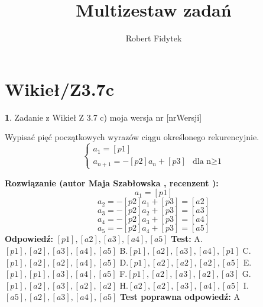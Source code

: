 \documentclass[12pt, a4paper]{article}
\title{Multizestaw zadań}
\author{Robert Fidytek}
\date{}
\theoremstyle{definition} %
\newtheorem{zad}{}
\newcommand{\kategoria}[1]{\section{#1}} %
\newcommand{\zadStart}[1]{\begin{zad}#1\newline} %
\newcommand{\zadStop}{\end{zad}}   %
\newcommand{\rozwStart}[2]{\noindent \textbf{Rozwiązanie (autor #1 , recenzent #2): }\newline} %
\newcommand{\rozwStop}{\newline}                                            %
\newcommand{\odpStart}{\noindent \textbf{Odpowiedź:}\newline}    %
\newcommand{\odpStop}{\newline}                                             %
\newcommand{\testStart}{\noindent \textbf{Test:}\newline} %
\newcommand{\testStop}{\newline} %
\newcommand{\kluczStart}{\noindent \textbf{Test poprawna odpowiedź:}\newline} %
\newcommand{\kluczStop}{\newline} %
\begin{document}
\maketitle


\kategoria{Wikieł/Z3.7c}
\zadStart{Zadanie z Wikieł Z 3.7 c)  moja wersja nr [nrWersji]}

Wypisać pięć początkowych wyrazów ciągu określonego rekurencyjnie.
$$\left\{ \begin{array}{ll}
a_{1}=[p1]\\
a_{n+1}=-[p2]a_{n}+[p3]& \textrm{dla n$\geq$1} 
\end{array} \right.
$$
\zadStop
\rozwStart{Maja Szabłowska}{}
$$a_{1}=[p1]$$
$$a_{2}=-[p2]a_{1}+[p3]=[a2]$$
$$a_{3}=-[p2]a_{2}+[p3]=[a3]$$
$$a_{4}=-[p2]a_{3}+[p3]=[a4]$$
$$a_{5}=-[p2]a_{4}+[p3]=[a5]$$
\rozwStop
\odpStart
$[p1],[a2],[a3],[a4],[a5]$
\odpStop
\testStart
A.$[p1],[a2],[a3],[a4],[a5]$
B.$[p1],[a2],[a3],[a4],[p1]$
C.$[p1],[a2],[a2],[a4],[a5]$
D.$[p1],[a2],[a2],[a2],[a5]$
E.$[p1],[p1],[a3],[a4],[a5]$
F.$[p1],[a2],[a3],[a2],[a3]$
G.$[p1],[a2],[a3],[a2],[a2]$
H.$[a2],[a2],[a3],[a4],[a5]$
I.$[a5],[a2],[a3],[a4],[a5]$
\testStop
\kluczStart
A
\kluczStop
\end{document}
